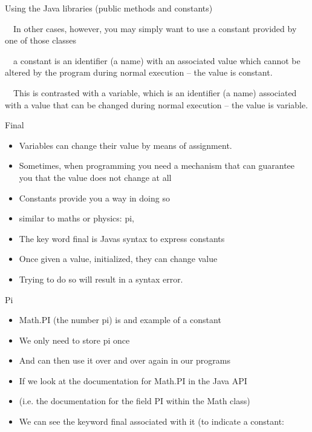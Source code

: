 \documentclass{beamer}
\begin{document}
\begin{frame}

Using the Java libraries (public methods and constants)

{\textbullet}\ \ In other cases, however, you may simply want to use a constant provided by one of those classes

{\textbullet}\ \ a constant is an identifier (a name) with an associated value which cannot be altered by the program
during normal execution -- the value is constant. 

{\textbullet}\ \ This is contrasted with a variable, which is an identifier (a name) associated with a value that can be
changed during normal execution -- the value is variable.

\end{frame} \begin{frame}

Final
\begin{itemize}
\item Variables can change their value by means of assignment.
\item Sometimes, when programming you need a mechanism that can guarantee you that the value does not change at all
\item Constants provide you a way in doing so
\item similar to maths or physics: pi, 
\item The key word final is Javas syntax to express constants 
\item Once given a value, initialized, they can change value 
\item Trying to do so will result in a syntax error.
\end{itemize}

\end{frame} \begin{frame}

Pi

\begin{itemize}
\item Math.PI (the number pi) is and example of a constant 
\item We only need to store pi once 
\item And can then use it over and over again in our programs
\item If we look at the documentation for Math.PI in the Java API 
\item (i.e. the documentation for the field PI within the Math class)
\item We can see the keyword final associated with it (to indicate a constant:
\end{itemize}


\end{frame}
\end{document}
